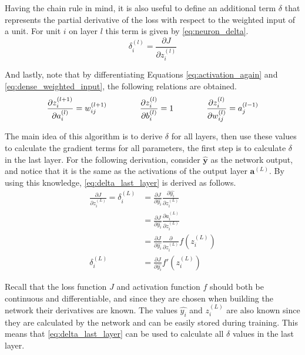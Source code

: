 Having the chain rule in mind, it is also useful to define an additional term $\delta$ that represents the partial derivative of the loss with respect to the weighted input of a unit. For unit $i$ on layer $l$ this term is given by \autoref{eq:neuron_delta}.
\begin{equation} \label{eq:neuron_delta}
    \delta_{i}^{(l)} = \frac{\partial J}{\partial z_i^{(l)}}
\end{equation}

And lastly, note that by differentiating Equations \ref{eq:activation_again} and \ref{eq:dense_weighted_input}, the following relations are obtained.
\begin{equation*}
    \frac{\partial z_i^{(l+1)}}{\partial a_i^{(l)}} = w_{ij}^{(l+1)}
    \qquad
    \qquad
    \frac{\partial z_i^{(l)}}{\partial b_i^{(l)}} = 1
    \qquad \qquad
    \frac{\partial z_i^{(l)}}{\partial w_{ij}^{(l)}} = a_j^{(l-1)}
    \\[2pt]
\end{equation*}

The main idea of this algorithm is to derive $\delta$ for all layers, then use these values to calculate the gradient terms for all parameters, the first step is to calculate $\delta$ in the last layer. For the following derivation, consider $\hat{\bm{y}}$ as the network output, and notice that it is the same as the activations of the output layer $\bm{a}^{(L)}$. By using this knowledge, \autoref{eq:delta_last_layer} is derived as follows.
\begin{align}
    \frac{\partial J}{\partial z_i^{(L)}} = \delta_{i}^{(L)} &=
    \frac{\partial J}{\partial \hat{y_i}} \frac{\partial \hat{y_i}}{\partial z_i^{(L)}} \nonumber \\[10pt]
    &= \frac{\partial J}{\partial \hat{y_i}} \frac{\partial a_i^{(L)}}{\partial z_i^{(L)}} \nonumber \\[10pt]
    &= \frac{\partial J}{\partial \hat{y_i}} \frac{\partial}{\partial z_i^{(L)}} {f\left(z_i^{(L)}\right)} \nonumber \\[10pt]
    \delta_{i}^{(L)} &= \frac{\partial J}{\partial \hat{y_i}} f'\left(z_i^{(L)}\right) \label{eq:delta_last_layer}
\end{align}

Recall that the loss function $J$ and activation function $f$ should both be continuous and differentiable, and since they are chosen when building the network their derivatives are known. The values $\hat{y_i}$ and $z_i^{(L)}$ are also known since they are calculated by the network and can be easily stored during training. This means that \autoref{eq:delta_last_layer} can be used to calculate all $\delta$ values in the last layer.

